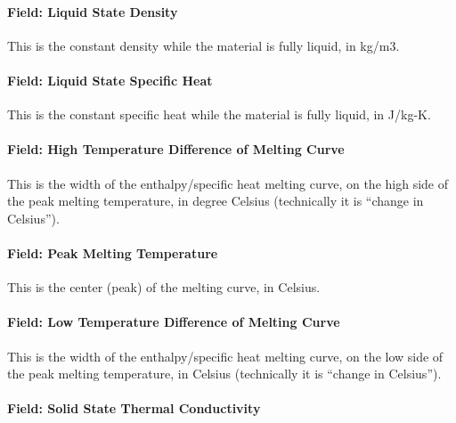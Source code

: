 \paragraph{Field: Liquid State Density}\label{materialpropertyphasechangehysteresis-inputs-liquidrho}

This is the constant density while the material is fully liquid, in kg/m3.

\paragraph{Field: Liquid State Specific Heat}\label{materialpropertyphasechangehysteresis-inputs-liquid-state-specific-heat}

This is the constant specific heat while the material is fully liquid, in J/kg-K.

\paragraph{Field: High Temperature Difference of Melting Curve}\label{materialpropertyphasechangehysteresis-inputs-high-temperature-difference-of-melting-curve}

This is the width of the enthalpy/specific heat melting curve, on the high side of the peak melting temperature, in degree Celsius (technically it is ``change in Celsius'').

\paragraph{Field: Peak Melting Temperature}\label{materialpropertyphasechangehysteresis-inputs-peak-melting-temperature}

This is the center (peak) of the melting curve, in Celsius.

\paragraph{Field: Low Temperature Difference of Melting Curve}\label{materialpropertyphasechangehysteresis-inputs-low-temperature-difference-of-melting-curve}

This is the width of the enthalpy/specific heat melting curve, on the low side of the peak melting temperature, in Celsius (technically it is ``change in Celsius'').

\paragraph{Field: Solid State Thermal Conductivity}\label{materialpropertyphasechangehysteresis-inputs-solidk}


